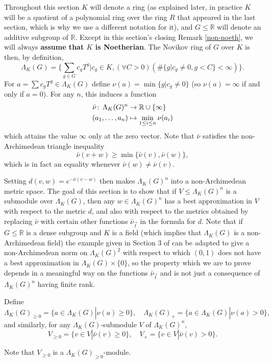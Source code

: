 \documentclass{amsart}
\theoremstyle{plain}
\theoremstyle{definition}
\theoremstyle{remark}
\def\co{\colon\thinspace}
\def\barnu{\bar{\nu}}
\begin{document}
Throughout this section $K$ will denote a  ring (as explained later, in practice $K$ will be a quotient of a polynomial ring over the ring $R$ that appeared in the last section, which is why we use a different notation for it), and $G\leq \mathbb{R}$ will denote an additive subgroup of $\mathbb{R}$.  Except in this section's closing Remark \ref{non-noeth}, we will always \textbf{assume that $K$ is Noetherian}. The Novikov ring of $G$ over $K$ is then, by definition, \[ \Lambda_K(G)=\{\sum_{g\in G}c_gT^g|c_g\in K,(\forall C>0)(\#\{g|c_g\neq 0,g<C\}<\infty)\}.\] For $a=\sum c_gT^g\in \Lambda_K(G)$ define $\nu(a)=\min\{g|c_g\neq 0\}$ (so $\nu(a)=\infty$ if and only if $a=0$).  For any $n$, this induces a function \begin{align*} \barnu\co \Lambda_K(G)^n&\to\mathbb{R}\cup\{\infty\} \\(a_1,\ldots,a_n)&\mapsto \min_{1\leq i\leq n}\nu(a_i)\end{align*} which attains the value $\infty$ only at the zero vector.  Note that $\barnu$ satisfies the non-Archimedean triangle inequality \[ \barnu(v+w)\geq \min\{\barnu(v),\barnu(w)\},\] which is in fact an equality whenever $\barnu(w)\neq\barnu(v)$.  

Setting $d(v,w)=e^{-\barnu(v-w)}$ then makes $\Lambda_K(G)^n$ into a non-Archimedean metric space.  The goal of this section is to show that if $V\leq \Lambda_K(G)^n$ is a submodule over $\Lambda_K(G)$, then  any $w\in \Lambda_K(G)^n$ has a best approximation in $V$ with respect to the metric $d$, and also with respect to the metrics obtained by replacing $\barnu$ with certain other functions $\barnu_{\vec{t}}$ in the formula for $d$.  Note that if $G\leq \mathbb{R}$ is a dense subgroup and $K$ is a field (which implies that $\Lambda_K(G)$ is a non-Archimedean field) the example given in Section 3 of \cite{IH} can be adapted to give a non-Archimedean norm on $\Lambda_K(G)^2$ with respect to which $(0,1)$ does not have a best approximation in $\Lambda_K(G)\times\{0\}$, so the property which we are to prove depends in a meaningful way on the functions $\barnu_{\vec{t}}$ and is not just a consequence of $\Lambda_K(G)^n$ having finite rank.

Define \[ \Lambda_K(G)_{\geq 0}=\{a\in \Lambda_K(G)|\nu(a)\geq 0\},\quad \Lambda_K(G)_{+}=\{a\in \Lambda_K(G)|\nu(a)> 0\},\] and similarly, for any $\Lambda_K(G)$-submodule $V$ of $\Lambda_K(G)^n$, \[
V_{\geq 0}=\{v\in V|\barnu(v)\geq 0\},\quad V_+=\{v\in V|\barnu(v)>0\}.\]

Note that $V_{\geq 0}$ is a $\Lambda_K(G)_{\geq 0}$-module.
\end{document}
